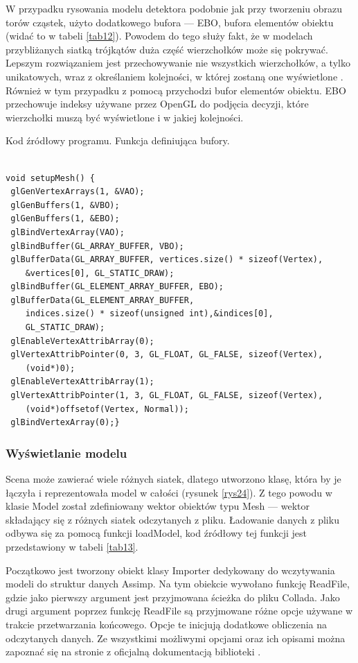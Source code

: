 W przypadku rysowania modelu detektora podobnie jak przy tworzeniu obrazu torów cząstek, użyto dodatkowego bufora --- EBO, bufora elementów obiektu (widać to w tabeli \ref{tab12}). Powodem do tego służy fakt, że w modelach przybliżanych siatką trójkątów duża część wierzchołków może się pokrywać. Lepszym rozwiązaniem jest przechowywanie nie wszystkich wierzchołków, a tylko unikatowych, wraz z określaniem kolejności, w której zostaną one wyświetlone \cite{learnopengl}. Również w tym przypadku z pomocą przychodzi bufor elementów obiektu. EBO przechowuje indeksy używane przez OpenGL do podjęcia decyzji, które wierzchołki muszą być wyświetlone i w jakiej kolejności.

\begin{table}[H]
\caption{Kod źródłowy programu. Funkcja definiująca bufory.}
\label{tab12}
\begin{lstlisting}[frame=single]  % Start your code-block

void setupMesh() {
 glGenVertexArrays(1, &VAO);
 glGenBuffers(1, &VBO);
 glGenBuffers(1, &EBO);
 glBindVertexArray(VAO);
 glBindBuffer(GL_ARRAY_BUFFER, VBO);
 glBufferData(GL_ARRAY_BUFFER, vertices.size() * sizeof(Vertex), 
 	&vertices[0], GL_STATIC_DRAW);
 glBindBuffer(GL_ELEMENT_ARRAY_BUFFER, EBO);
 glBufferData(GL_ELEMENT_ARRAY_BUFFER, 
 	indices.size() * sizeof(unsigned int),&indices[0], 
 	GL_STATIC_DRAW);
 glEnableVertexAttribArray(0);
 glVertexAttribPointer(0, 3, GL_FLOAT, GL_FALSE, sizeof(Vertex), 
 	(void*)0);
 glEnableVertexAttribArray(1);
 glVertexAttribPointer(1, 3, GL_FLOAT, GL_FALSE, sizeof(Vertex),
 	(void*)offsetof(Vertex, Normal));
 glBindVertexArray(0);}
\end{lstlisting}
\end{table}

\subsubsection{Wyświetlanie modelu}
Scena może zawierać wiele różnych siatek, dlatego utworzono klasę, która by je łączyła i reprezentowała model w całości (rysunek \ref{rys24}). Z tego powodu w klasie Model został zdefiniowany wektor obiektów typu Mesh --- wektor składający się z różnych siatek odczytanych z pliku. Ładowanie danych z pliku odbywa się za pomocą funkcji loadModel, kod źródłowy tej funkcji jest przedstawiony w tabeli \ref{tab13}.

Początkowo jest tworzony obiekt klasy Importer dedykowany do wczytywania modeli do struktur danych Assimp. Na tym obiekcie wywołano funkcję ReadFile, gdzie jako pierwszy argument jest przyjmowana ścieżka do pliku Collada. Jako drugi argument poprzez funkcję ReadFile są przyjmowane różne opcje używane w trakcie przetwarzania końcowego. Opcje te inicjują dodatkowe obliczenia na odczytanych danych. Ze wszystkimi możliwymi opcjami oraz ich opisami można zapoznać się na stronie z oficjalną dokumentacją biblioteki \cite{assimpDocumentation}.

